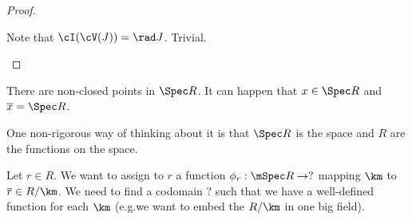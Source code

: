 \begin{proof}
	\begin{enum}
		\io Note that $\cI(\cV(J)) = \rad J$.
		\io Trivial. \qedhere
	\end{enum}
\end{proof}

\begin{rmk}
	There are non-closed points in $\Spec R$.
	It can happen that $x \in \Spec R$ and $\overline{x} = \Spec R$.
\end{rmk}

One non-rigorous way of thinking about it is that $\Spec R$ is the space and $R$ are the functions on the space.

Let $r \in R$.
We want to assign to $r$ a function $\phi_r: \mSpec R \to ?$ mapping $\km$ to $\overline{r} \in R/\km$.
We need to find a codomain $?$ such that we have a well-defined function for each $\km$ (e.g.\@ we want to embed the $R/\km$ in one big field).